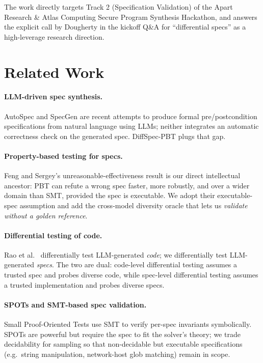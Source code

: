 \documentclass[11pt,a4paper]{article}
\begin{document}
The work directly targets Track 2 (Specification Validation) of the
Apart Research \& Atlas Computing Secure Program Synthesis Hackathon,
and answers the explicit call by Dougherty in the kickoff Q\&A for
``differential specs'' as a high-leverage research direction.

\section{Related Work}

\paragraph{LLM-driven spec synthesis.} AutoSpec \cite{ma2024autospec}
and SpecGen \cite{specgen2025} are recent attempts to produce formal
pre/postcondition specifications from natural language using LLMs;
neither integrates an automatic correctness check on the generated
spec. DiffSpec-PBT plugs that gap.

\paragraph{Property-based testing for specs.} Feng and Sergey's
unreasonable-effectiveness result \cite{feng2026pbt} is our direct
intellectual ancestor: PBT can refute a wrong spec faster, more
robustly, and over a wider domain than SMT, provided the spec is
executable. We adopt their executable-spec assumption and add the
cross-model diversity oracle that lets us \emph{validate without a
golden reference}.

\paragraph{Differential testing of code.} Rao et al.\
\cite{rao2024diffspec} differentially test LLM-generated
\emph{code}; we differentially test LLM-generated \emph{specs}. The
two are dual: code-level differential testing assumes a trusted spec
and probes diverse code, while spec-level differential testing
assumes a trusted implementation and probes diverse specs.

\paragraph{SPOTs and SMT-based spec validation.} Small Proof-Oriented
Tests \cite{lahiri2026spots} use SMT to verify per-spec invariants
symbolically. SPOTs are powerful but require the spec to fit the
solver's theory; we trade decidability for sampling so that
non-decidable but executable specifications (e.g.\ string
manipulation, network-host glob matching) remain in scope.
\end{document}
